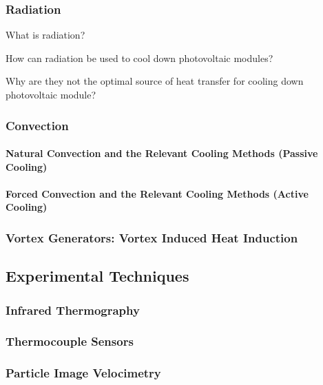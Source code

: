 \subsubsection{Radiation} %
\noindent What is radiation?\par
\noindent How can radiation be used to cool down photovoltaic modules?\par
\noindent Why are they not the optimal source of heat transfer for cooling down photovoltaic module?\par

\subsubsection{Convection} %
\paragraph{Natural Convection and the Relevant Cooling Methods (Passive Cooling)} %
\paragraph{Forced Convection and the Relevant Cooling Methods (Active Cooling)} %
\subsubsection{Vortex Generators: Vortex Induced Heat Induction} %

\pagebreak
\subsection{Experimental Techniques}
\subsubsection{Infrared Thermography}
\subsubsection{Thermocouple Sensors}
\subsubsection{Particle Image Velocimetry}

